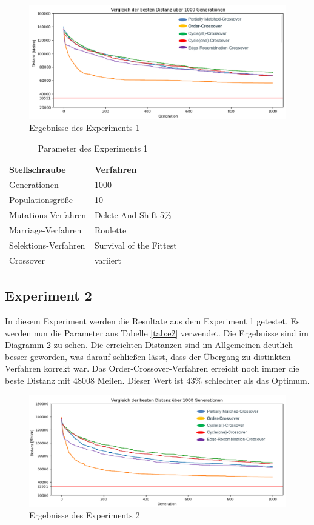 \begin{figure}[H]
\centering
\includegraphics[width=1\textwidth]{img/Vortrag/experiment1.png}
\caption{Ergebnisse des Experiments 1}
\label{fig:experiment1}
\end{figure}

\begin{table}[H]
\centering
\caption{Parameter des Experiments 1}
\begin{tabular}{ll}
Stellschraube & Verfahren \\
\hline
Generationen & 1000 \\
Populationsgröße & 10 \\
Mutations-Verfahren & Delete-And-Shift 5\% \\
Marriage-Verfahren & Roulette \\
Selektions-Verfahren & Survival of the Fittest \\
Crossover & variiert
\end{tabular}
\label{tab:e1}
\end{table}

\subsection{Experiment 2}
In diesem Experiment werden die Resultate aus dem Experiment 1 getestet. Es werden nun die Parameter aus Tabelle \ref{tab:e2} verwendet. Die Ergebnisse sind im Diagramm \ref{fig:experiment2} zu sehen.
Die erreichten Distanzen sind im Allgemeinen deutlich besser geworden, was darauf schließen lässt, dass der Übergang zu distinkten Verfahren korrekt war. Das Order-Crossover-Verfahren erreicht noch immer die beste Distanz mit 48008 Meilen. Dieser Wert ist 43\% schlechter als das Optimum.

\begin{figure}[H]
\centering
\includegraphics[width=1\textwidth]{img/Vortrag/experiment2.png}
\caption{Ergebnisse des Experiments 2}
\label{fig:experiment2}
\end{figure}

